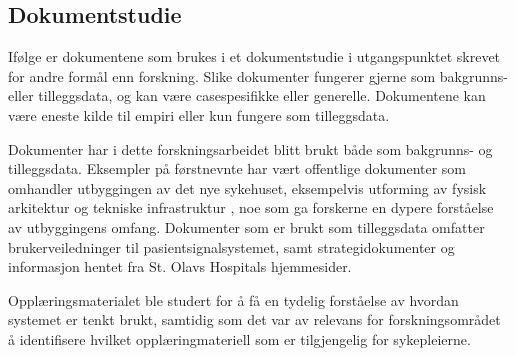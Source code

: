 \subsection{Dokumentstudie}
\label{sec:dokumentstudie}
Ifølge \citet{Tjora} er dokumentene som brukes i et dokumentstudie i utgangspunktet skrevet for andre formål enn forskning. Slike dokumenter fungerer gjerne som bakgrunns- eller tilleggsdata, og kan være casespesifikke eller generelle. Dokumentene kan være eneste kilde til empiri eller kun fungere som tilleggsdata. 

\noindent
Dokumenter har i dette forskningsarbeidet blitt brukt både som bakgrunns- og tilleggsdata. Eksempler på førstnevnte har vært offentlige dokumenter som omhandler utbyggingen av det nye sykehuset, eksempelvis utforming av fysisk arkitektur \citep{Aslaksen, Sintef-sengetun} og tekniske infrastruktur \citep{TU}, noe som ga forskerne en dypere forståelse av utbyggingens omfang. Dokumenter som er brukt som tilleggsdata omfatter brukerveiledninger til pasientsignalsystemet, samt strategidokumenter og informasjon hentet fra St. Olavs Hospitals hjemmesider. 

\noindent
Opplæringsmaterialet ble studert for å få en tydelig forståelse av hvordan systemet er tenkt brukt, samtidig som det var av relevans for forskningsområdet å identifisere hvilket opplæringmateriell som er tilgjengelig for sykepleierne.
